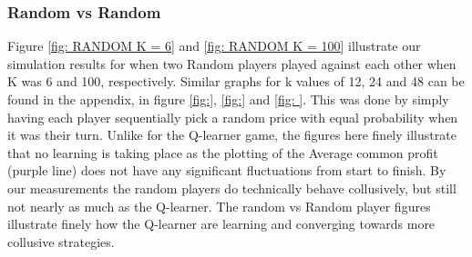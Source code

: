 \documentclass{article}
\begin{document}
\subsubsection{Random vs Random}
Figure \ref{fig: RANDOM K = 6} and \ref{fig: RANDOM K = 100} illustrate our simulation results for when two Random players played against each other when K was 6 and 100, respectively. Similar graphs for k values of 12, 24 and 48 can be found in the appendix, in figure \ref{fig:}, \ref{fig:} and \ref{fig: }. This was done by simply having each player sequentially pick a random price with equal probability when it was their turn. Unlike for the Q-learner game, the figures here finely illustrate that no learning is taking place as the plotting of the Average common profit (purple line) does not have any significant fluctuations from start to finish. By our measurements the random players do technically behave collusively, but still not nearly as much as the Q-learner. The random vs Random player figures illustrate finely how the Q-learner are learning and converging towards more collusive strategies.   
\end{document}
